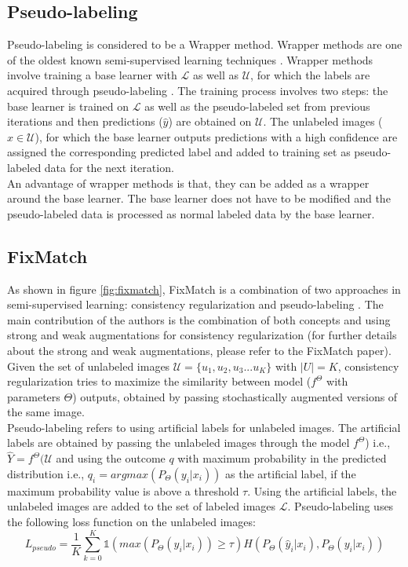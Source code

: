 \subsection{Pseudo-labeling}
Pseudo-labeling is considered to be a Wrapper method. Wrapper methods are one of the oldest known semi-supervised learning techniques \cite{van2020}. Wrapper methods involve training a base learner with $\mathcal{L}$ as well as $\mathcal{U}$, for which the labels are acquired through pseudo-labeling \cite{mclachlan1975}. The training process involves two steps: the base learner is trained on $\mathcal{L}$ as well as the pseudo-labeled set from previous iterations and then predictions ($\hat{y}$) are obtained on $\mathcal{U}$. The unlabeled images ($x \in \mathcal{U}$), for which the base learner outputs predictions with a high confidence are assigned the corresponding predicted label and added to training set as pseudo-labeled data for the next iteration. \\
An advantage of wrapper methods is that, they can be added as a wrapper around the base learner. The base learner does not have to be modified and the pseudo-labeled data is processed as normal labeled data by the base learner.

\subsection{FixMatch}
As shown in figure \ref{fig:fixmatch}, FixMatch \cite{sohn2020} is a combination of two approaches in semi-supervised learning: consistency regularization \cite{sajjadi2016} and pseudo-labeling \cite{mclachlan1975}. The main contribution of the authors is the combination of both concepts and using strong and weak augmentations for consistency regularization (for further details about the strong and weak augmentations, please refer to the FixMatch paper). \\
Given the set of unlabeled images $\mathcal{U} = \{u_1, u_2, u_3 ... u_K\}$ with $|U| = K$, consistency regularization tries to maximize the similarity between model ($f^\Theta$ with parameters $\Theta$) outputs, obtained by passing stochastically augmented versions of the same image. \\
Pseudo-labeling refers to using artificial labels for unlabeled images. The artificial labels are obtained by passing the unlabeled images through the model $f^\Theta$) i.e., $\hat{Y} = f^\Theta(\mathcal{U}$ and using the outcome $q$ with maximum probability in the predicted distribution i.e., $q_i = argmax(P_{\Theta}(y_i | x_i))$ as the artificial label, if the maximum probability value is above a threshold $\tau$. Using the artificial labels, the unlabeled images are added to the set of labeled images $\mathcal{L}$. Pseudo-labeling uses the following loss function on the unlabeled images:
\begin{equation}
    \label{equation:fixmatch_pseudo_labeling_loss}
    L_{pseudo} = \frac{1}{K} \sum_{k=0}^{K} \mathbb{1}(max(P_{\Theta}(y_i | x_i)) \geq \tau) H(P_{\Theta}(\hat{y}_i | x_i), P_{\Theta}(y_i | x_i))
\end{equation}

